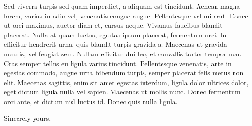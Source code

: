 \documentclass[10pt]{letter}
\begin{document}
\begin{letter}{}
Sed viverra turpis sed quam imperdiet, a aliquam est tincidunt. Aenean magna
lorem, varius in odio vel, venenatis congue augue. Pellentesque vel mi erat.
Donec ut orci maximus, auctor diam et, cursus neque. Vivamus faucibus blandit
placerat. Nulla at quam luctus, egestas ipsum placerat, fermentum orci. In
efficitur hendrerit urna, quis blandit turpis gravida a. Maecenas ut gravida
mauris, vel feugiat sem. Nullam efficitur dui leo, et convallis tortor tempor
non. Cras semper tellus eu ligula varius tincidunt. Pellentesque venenatis,
ante in egestas commodo, augue urna bibendum turpis, semper placerat felis
metus non elit. Maecenas sagittis, enim sit amet egestas interdum, ligula dolor
ultrices dolor, eget dictum ligula nulla vel sapien. Maecenas ut mollis nunc.
Donec fermentum orci ante, et dictum nisl luctus id. Donec quis nulla ligula.

\closing{Sincerely yours,}
\end{letter}
\end{document}
